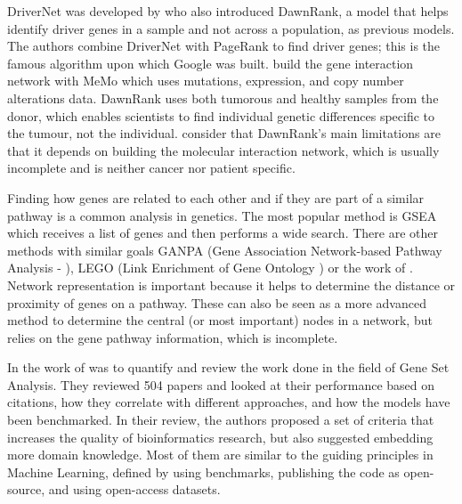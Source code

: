 DriverNet was developed by \citet{Hou2014-se} who also introduced DawnRank, a model that helps identify driver genes in a sample and not across a population, as previous models. The authors combine DriverNet with PageRank to find driver genes; this is the famous algorithm upon which Google was built. \citet{Hou2014-se} build the gene interaction network with MeMo \citep{Ciriello2012-hi} which uses mutations, expression, and copy number alterations data. DawnRank uses both tumorous and healthy samples from the donor, which enables scientists to find individual genetic differences specific to the tumour, not the individual. \citet{Hou2014-se} consider that DawnRank's main limitations are that it depends on building the molecular interaction network, which is usually incomplete and is neither cancer nor patient specific. 


Finding how genes are related to each other and if they are part of a similar pathway is a common analysis in genetics. The most popular method is \gls{GSEA} which receives a list of genes and then performs a wide search. There are other methods with similar goals GANPA (Gene Association Network-based Pathway Analysis - \citep{Fang2012-vr}), LEGO (Link Enrichment of Gene Ontology \citep{Dong2016-zs}) or the work of \citet{Cava2018-rv}. Network representation is important because it helps to determine the distance or proximity of genes on a pathway. These can also be seen as a more advanced method to determine the central (or most important) nodes in a network, but relies on the gene pathway information, which is incomplete.

In the work of \citep{Xie2021-al} was to quantify and review the work done in the field of Gene Set Analysis. They reviewed 504 papers and looked at their performance based on citations, how they correlate with different approaches, and how the models have been benchmarked. In their review, the authors proposed a set of criteria that increases the quality of bioinformatics research, but also suggested embedding more domain knowledge. Most of them are similar to the guiding principles in Machine Learning, defined by using benchmarks, publishing the code as open-source, and using open-access datasets.


